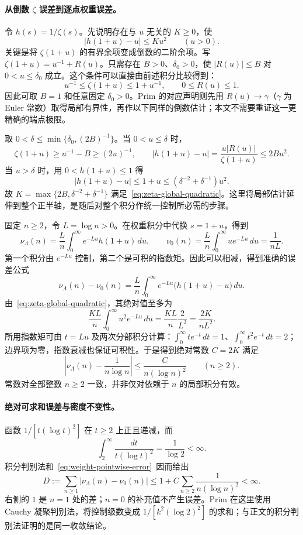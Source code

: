 \paragraph{从倒数 $\zeta$ 误差到逐点权重误差。}
令 $h(s)=1/\zeta(s)$。先说明存在与 $u$ 无关的 $K\ge0$，使
\begin{equation}\label{eq:zeta-global-quadratic}
 |h(1+u)-u|\le Ku^2\qquad(u>0).
\end{equation}
关键是将 $\zeta(1+u)$ 的有界余项变成倒数的二阶余项。写
$\zeta(1+u)=u^{-1}+R(u)$。只需存在 $B>0$、$\delta_0>0$，使 $|R(u)|\le B$ 对 $0<u\le\delta_0$ 成立。这个条件可以直接由前述积分比较得到：
\[
 u^{-1}\le\zeta(1+u)\le1+u^{-1},\qquad 0\le R(u)\le1.
\]
因此可取 $B=1$ 和任意固定 $\delta_0>0$。Prim 的对应声明则先用 $R(u)\to\gamma$（$\gamma$ 为 Euler 常数）取得局部有界性，再作以下同样的倒数估计；本文不需要重证这一更精确的端点极限。

取 $0<\delta\le\min\{\delta_0,(2B)^{-1}\}$。当 $0<u\le\delta$ 时，
\[
 \zeta(1+u)\ge u^{-1}-B\ge(2u)^{-1},\qquad
 |h(1+u)-u|
 =\frac{u|R(u)|}{\zeta(1+u)}\le2Bu^2.
\]
当 $u>\delta$ 时，用 $0<h(1+u)\le1$ 得
\[
 |h(1+u)-u|\le1+u
 \le(\delta^{-2}+\delta^{-1})u^2.
\]
故 $K=\max\{2B,\delta^{-2}+\delta^{-1}\}$ 满足~\eqref{eq:zeta-global-quadratic}。这里将局部估计延伸到整个正半轴，是随后对整个积分作统一控制所必需的步骤。

固定 $n\ge2$，令 $L=\log n>0$。在权重积分中代换 $s=1+u$，得到
\[
 \nu_\Lambda(n)=\frac Ln\int_0^\infty e^{-Lu}h(1+u)\,du,
 \qquad
 \nu_0(n)=\frac Ln\int_0^\infty ue^{-Lu}\,du=\frac1{nL}.
\]
第一个积分由 $e^{-Lu}$ 控制，第二个是可积的指数矩。因此可以相减，得到准确的误差公式
\begin{equation}\label{eq:weight-laplace-error}
 \nu_\Lambda(n)-\nu_0(n)
 =\frac Ln\int_0^\infty e^{-Lu}\bigl(h(1+u)-u\bigr)\,du.
\end{equation}
由~\eqref{eq:zeta-global-quadratic}，其绝对值至多为
\[
 \frac{KL}{n}\int_0^\infty u^2e^{-Lu}\,du
 =\frac{KL}{n}\frac2{L^3}=\frac{2K}{nL^2}.
\]
所用指数矩可由 $t=Lu$ 及两次分部积分计算：$\int_0^\infty te^{-t}\,dt=1$、$\int_0^\infty t^2e^{-t}\,dt=2$；边界项为零，指数衰减也保证可积性。于是得到绝对常数 $C=2K$ 满足
\begin{equation}\label{eq:weight-pointwise-error}
 \boxed{\left|\nu_\Lambda(n)-\frac1{n\log n}\right|
 \le\frac{C}{n(\log n)^2}\qquad(n\ge2).}
\end{equation}
常数对全部整数 $n\ge2$ 一致，并非仅对依赖于 $n$ 的局部积分有效。

\paragraph{绝对可求和误差与密度不变性。}
函数 $1/[t(\log t)^2]$ 在 $t\ge2$ 上正且递减，而
\[
 \int_2^\infty\frac{dt}{t(\log t)^2}=\frac1{\log2}<\infty.
\]
积分判别法和~\eqref{eq:weight-pointwise-error}~因而给出
\begin{equation}\label{eq:weight-summable-error}
 D:=\sum_{n\ge1}|\nu_\Lambda(n)-\nu_0(n)|
 \le1+C\sum_{n\ge2}\frac1{n(\log n)^2}<\infty.
\end{equation}
右侧的 $1$ 是 $n=1$ 处的差；$n=0$ 的补充值不产生误差。Prim 在这里使用 Cauchy 凝聚判别法，将控制级数变成 $1/[k^2(\log2)^2]$ 的求和；与正文的积分判别法证明的是同一收敛结论。

